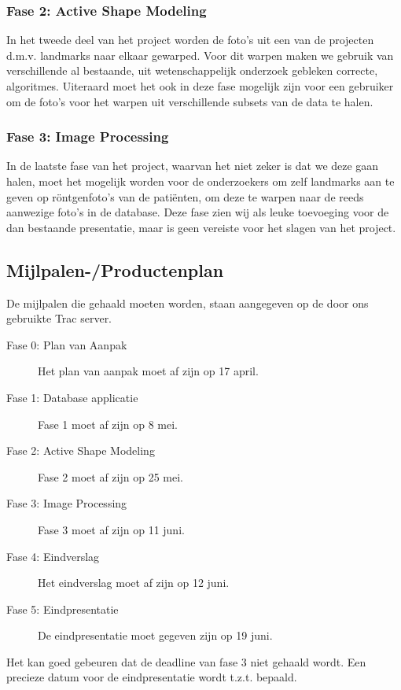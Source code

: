 \subsubsection{Fase 2: Active Shape Modeling}
In het tweede deel van het project worden de foto's uit een van de projecten d.m.v. landmarks naar elkaar gewarped. 
Voor dit warpen maken we gebruik van verschillende al bestaande, uit wetenschappelijk onderzoek gebleken correcte, algoritmes.
Uiteraard moet het ook in deze fase mogelijk zijn voor een gebruiker om de foto's voor het warpen uit verschillende subsets van de data te halen.

\subsubsection{Fase 3: Image Processing}
In de laatste fase van het project, waarvan het niet zeker is dat we deze gaan halen, moet het mogelijk worden voor de onderzoekers om zelf landmarks aan te geven op r\"ontgenfoto's van de pati\"enten, om deze te warpen naar de reeds aanwezige foto's in de database. Deze fase zien wij als leuke toevoeging voor de dan bestaande presentatie, maar is geen vereiste voor het slagen van het project.


\subsection{Mijlpalen-/Productenplan}
De mijlpalen die gehaald moeten worden, staan aangegeven op de door ons gebruikte Trac server.
\begin{description}
	\item[Fase 0: Plan van Aanpak] Het plan van aanpak moet af zijn op 17 april.
	\item[Fase 1: Database applicatie] Fase 1 moet af zijn op 8 mei.
	\item[Fase 2: Active Shape Modeling] Fase 2 moet af zijn op 25 mei.
	\item[Fase 3: Image Processing] Fase 3 moet af zijn op 11 juni.
	\item[Fase 4: Eindverslag] Het eindverslag moet af zijn op 12 juni.
	\item[Fase 5: Eindpresentatie] De eindpresentatie moet gegeven zijn op 19 juni.
\end{description}
Het kan goed gebeuren dat de deadline van fase 3 niet gehaald wordt.
Een precieze datum voor de eindpresentatie wordt t.z.t. bepaald.


